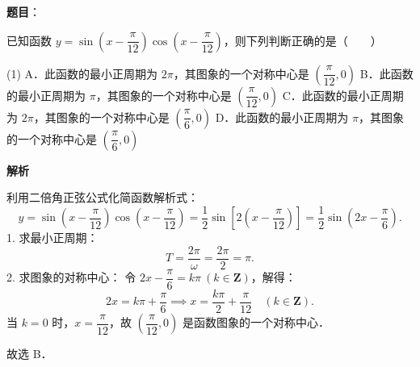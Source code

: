 \begin{answer}

\textbf{题目}：

已知函数 $y = \sin\left(x - \dfrac{\pi}{12}\right)\cos\left(x - \dfrac{\pi}{12}\right)$，则下列判断正确的是\mbox{（　　）}

\begin{gkopts}(1)
\task A．此函数的最小正周期为 $2\pi$，其图象的一个对称中心是 $\left(\dfrac{\pi}{12}, 0\right)$
\task B．此函数的最小正周期为 $\pi$，其图象的一个对称中心是 $\left(\dfrac{\pi}{12}, 0\right)$
\task C．此函数的最小正周期为 $2\pi$，其图象的一个对称中心是 $\left(\dfrac{\pi}{6}, 0\right)$
\task D．此函数的最小正周期为 $\pi$，其图象的一个对称中心是 $\left(\dfrac{\pi}{6}, 0\right)$
\end{gkopts}

\textbf{解析}

利用二倍角正弦公式化简函数解析式：
\nopagebreak[4]
\[
y = \sin\left(x - \dfrac{\pi}{12}\right)\cos\left(x - \dfrac{\pi}{12}\right) = \dfrac{1}{2}\sin\left[2\left(x - \dfrac{\pi}{12}\right)\right] = \dfrac{1}{2}\sin\left(2x - \dfrac{\pi}{6}\right).
\]
1. 求最小正周期：
\nopagebreak[4]
\[
T = \dfrac{2\pi}{\omega} = \dfrac{2\pi}{2} = \pi.
\]
2. 求图象的对称中心：
令 $2x - \dfrac{\pi}{6} = k\pi\ (k \in \mathbf{Z})$，解得：
\nopagebreak[4]
\[
2x = k\pi + \dfrac{\pi}{6} \implies x = \dfrac{k\pi}{2} + \dfrac{\pi}{12} \quad (k \in \mathbf{Z}).
\]
当 $k = 0$ 时，$x = \dfrac{\pi}{12}$，故 $\left(\dfrac{\pi}{12}, 0\right)$ 是函数图象的一个对称中心．

故选 B．


\end{answer}
